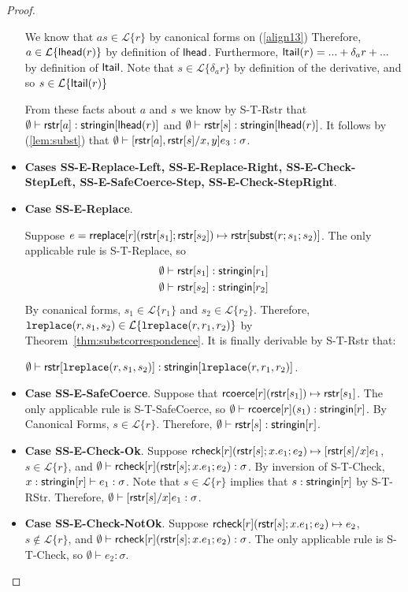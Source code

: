 \documentclass[11pt,leqno]{article}
\theoremstyle{definition}
\newcommand{\Lagr}{\mathcal{L}}
\newcommand{\lang}[1]{\Lagr\{#1\}}
\newcommand{\rcoerce}[2]{{\sf rcoerce}[#1](#2)}
\newcommand{\rcheck}[4]{ {\sf rcheck}[#1](#2;#3;#4) }
\newcommand{\stringin}[1]{{\sf stringin}[#1]}
\newcommand{\lsubst}[3]{{\sf subst}(#1;#2;#3)} %
\newcommand{\lreplace}[3]{{\sf lreplace}(#1; #2; #3)}
\newcommand{\lhead}[1]{ {\sf lhead}(#1) }
\newcommand{\ltail}[1]{ {\sf ltail}(#1) }
\renewcommand{\lreplace}[3]{{\tt lreplace}(#1, #2, #3)}
\begin{document}
\begin{proof}
\begin{itemize}[label=$ $,itemsep=1ex]
We know that $as \in \lang{r}$ by canonical forms on (\ref{align13}) 
Therefore, $a \in \lang{\lhead{r}}$ by definition of ${\sf lhead}$.
Furthermore, $\ltail{r} = ... + \delta_a{r} + ...$ by definition of ${\sf ltail}$.
Note that $s \in \lang{\delta_a{r}}$ by definition of the derivative, and so
$s \in \lang{\ltail{r}}$

From these facts about $a$ and $s$ we know by S-T-Rstr that $\emptyset\vdash \rstr{a} : \stringin{\lhead{r}}$
and $\emptyset\vdash \rstr{s} : \stringin{\lhead{r}}$.
It follows by (\ref{lem:subst}) that  $\emptyset\vdash [{\sf rstr}[a], {\sf rstr}[s] / x,y] e_3 : \sigma$.

\item \textbf{Cases SS-E-Replace-Left, SS-E-Replace-Right, SS-E-Check-StepLeft, SS-E-SafeCoerce-Step, SS-E-Check-StepRight}. 

\item \textbf{Case SS-E-Replace}.

Suppose $e = \rreplace{r}{\rstr{s_1}}{\rstr{s_2}} \mapsto \rstr{\lsubst{r}{s_1}{s_2}}$.
The only applicable rule is 
S-T-Replace, so
\begin{align*}
\emptyset &\vdash \rstr{s_1} : \stringin{r_1} \\
\emptyset &\vdash \rstr{s_2} : \stringin{r_2}
\end{align*}
By conanical forms,
$s_1 \in \lang{r_1}$ and $s_2 \in \lang{r_2}$.
Therefore, $\lreplace{r}{s_1}{s_2} \in \lang{\lreplace{r}{r_1}{r_2}}$ by Theorem~\ref{thm:substcorrespondence}.
It is finally derivable by S-T-Rstr that:

$\emptyset \vdash \rstr{\lreplace{r}{s_1}{s_2}} : \stringin{\lreplace{r}{r_1}{r_2}}$.


\item \textbf{Case SS-E-SafeCoerce}.
Suppose that $\rcoerce{r}{\rstr{s_1}} \mapsto \rstr{s_1}$.
The only applicable rule is S-T-SafeCoerce, so 
$\emptyset\vdash \rcoerce{r}{s_1} : \stringin{r}$.
By Canonical Forms, $s \in \lang{r}$. Therefore, $\emptyset\vdash \rstr{s} : \stringin{r}$.

\item \textbf{Case SS-E-Check-Ok}.
Suppose $\rcheck{r}{\rstr{s}}{x.e_1}{e_2} \mapsto \subst{\rstr{s}}{x}{e_1}$,
$s \in \lang{r}$, and $\emptyset \vdash \rcheck{r}{\rstr{s}}{x.e_1}{e_2} : \sigma$.
By inversion of S-T-Check, $x : \stringin{r} \vdash e_1 : \sigma$.
Note that $s \in \lang{r}$ implies that $s : \stringin{r}$ by S-T-RStr.
Therefore, $\emptyset \vdash [{\sf rstr}[s]/x]e_1 : \sigma$.

\item \textbf{Case SS-E-Check-NotOk}.
Suppose $\rcheck{r}{\rstr{s}}{x.e_1}{e_2} \mapsto e_2$,
$s \not \in \lang{r}$, and $\emptyset \vdash \rcheck{r}{\rstr{s}}{x.e_1}{e_2} : \sigma$.
The only applicable rule is S-T-Check, so $\emptyset \vdash e_2 : \sigma$.

\end{itemize}
\end{proof}
\end{document}
